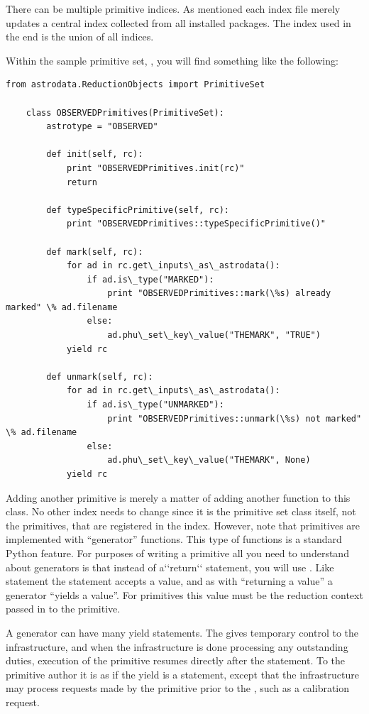 \documentclass[letterpaper,10pt,english]{sphinxmanual}
\begin{document}
There can be multiple primitive indices. As mentioned each index file
merely updates a central index collected from all installed packages.
The index used in the end is the union of all indices.

Within the sample primitive set, ,
you will find something like the following:

\begin{Verbatim}[commandchars=\\\{\}]
from astrodata.ReductionObjects import PrimitiveSet

    class OBSERVEDPrimitives(PrimitiveSet):
        astrotype = "OBSERVED"

        def init(self, rc):
            print "OBSERVEDPrimitives.init(rc)"
            return

        def typeSpecificPrimitive(self, rc):
            print "OBSERVEDPrimitives::typeSpecificPrimitive()"

        def mark(self, rc):
            for ad in rc.get\_inputs\_as\_astrodata():
                if ad.is\_type("MARKED"):
                    print "OBSERVEDPrimitives::mark(\%s) already marked" \% ad.filename
                else:
                    ad.phu\_set\_key\_value("THEMARK", "TRUE")
            yield rc

        def unmark(self, rc):
            for ad in rc.get\_inputs\_as\_astrodata():
                if ad.is\_type("UNMARKED"):
                    print "OBSERVEDPrimitives::unmark(\%s) not marked" \% ad.filename
                else:
                    ad.phu\_set\_key\_value("THEMARK", None)
            yield rc
\end{Verbatim}

Adding another primitive is merely a matter of adding another function to this
class.  No other index needs to change since it is the primitive set class
itself, not the primitives, that are registered in the index. However, note that
primitives are implemented with ``generator'' functions. This type of functions
is a standard Python feature. For purposes of writing a primitive all you need
to understand about generators is that instead of a{}`{}`return{}`{}` statement, you
will use .  Like  statement the  statement accepts a
value, and as with ``returning a value'' a generator ``yields a value''.
For primitives this value
must be the reduction context passed in to the primitive.

A generator can have many yield statements.  The  gives temporary
control to the infrastructure, and when the infrastructure is done processing
any outstanding duties, execution of the primitive resumes directly after the
 statement. To the primitive author it is as if the yield is a 
statement, except that the infrastructure may process requests made by the
primitive prior to the , such as a calibration request.
\end{document}
